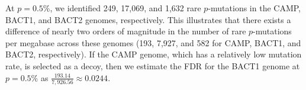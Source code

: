 At $p=0.5$\%, we identified 249, 17,069, and 1,632 rare $p$-mutations in the CAMP, BACT1, and BACT2 genomes, respectively. This illustrates that there exists a difference of nearly two orders of magnitude in the number of rare $p$-mutations per megabase across these genomes (193, 7,927, and 582 for CAMP, BACT1, and BACT2, respectively). If the CAMP genome, which has a relatively low mutation rate, is selected as a decoy, then we estimate the FDR for the BACT1 genome at $p=0.5\%$ as $\frac{193.14}{7,926.56} \approx 0.0244$.\endinput